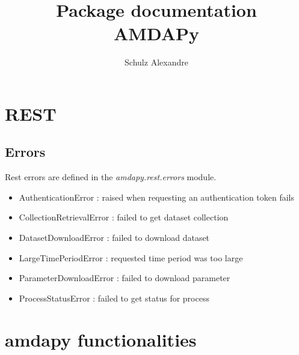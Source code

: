 \documentclass[a4paper,11pt]{report}
\author{Schulz Alexandre}
\title{Package documentation\\AMDAPy}
\begin{document}
\maketitle

\section{REST}
\subsection{Errors}
Rest errors are defined in the \emph{amdapy.rest.errors} module.

\begin{itemize}
	\item AuthenticationError : raised when requesting an authentication token fails
	\item CollectionRetrievalError : failed to get dataset collection
	\item DatasetDownloadError : failed to download dataset
	\item LargeTimePeriodError : requested time period was too large
	\item ParameterDownloadError : failed to download parameter

	\item ProcessStatusError : failed to get status for process

\end{itemize}

\section{amdapy functionalities}
\end{document}
